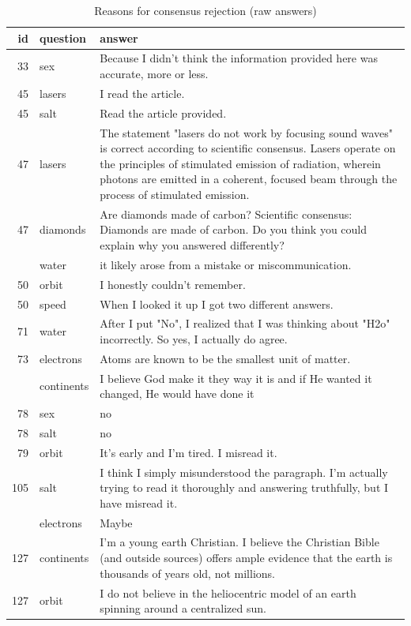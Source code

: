 \documentclass[
  doc,floatsintext]{apa6}
\begin{document}
\begin{longtable}[t]{>{}r>{}l>{\raggedright\arraybackslash}p{30em}}
\caption{\label{tab:exp2-reasons-rejection}Reasons for consensus rejection (raw answers)}\\
\toprule
id & question & answer\\
\midrule
33 & sex & Because I didn't think the information provided here was accurate, more or less.\\
45 & lasers & I read the article.\\
45 & salt & Read the article provided.\\
47 & lasers & The statement "lasers do not work by focusing sound waves" is correct according to scientific consensus. Lasers operate on the principles of stimulated emission of radiation, wherein photons are emitted in a coherent, focused beam through the process of stimulated emission.\\
47 & diamonds & Are diamonds made of carbon? Scientific consensus: Diamonds are made of carbon.  Do you think you could explain why you answered differently?\\
\addlinespace
47 & water & it likely arose from a mistake or miscommunication.\\
50 & orbit & I honestly couldn't remember.\\
50 & speed & When I looked it up I got two different answers.\\
71 & water & After I put "No", I realized that I was thinking about "H2o" incorrectly. So yes, I actually do agree.\\
73 & electrons & Atoms are known to be the smallest unit of matter.\\
\addlinespace
77 & continents & I believe God make it they way it is and if He wanted it changed, He would have done it\\
78 & sex & no\\
78 & salt & no\\
79 & orbit & It’s early and I’m tired. I misread it.\\
105 & salt & I think I simply misunderstood the paragraph. I'm actually trying to read it thoroughly and answering truthfully, but I have misread it.\\
\addlinespace
109 & electrons & Maybe\\
127 & continents & I'm a young earth Christian. I believe the Christian Bible (and outside sources) offers ample evidence that the earth is thousands of years old, not millions.\\
127 & orbit & I do not believe in the heliocentric model of an earth spinning around a centralized sun.\\

\end{longtable}
\end{document}
